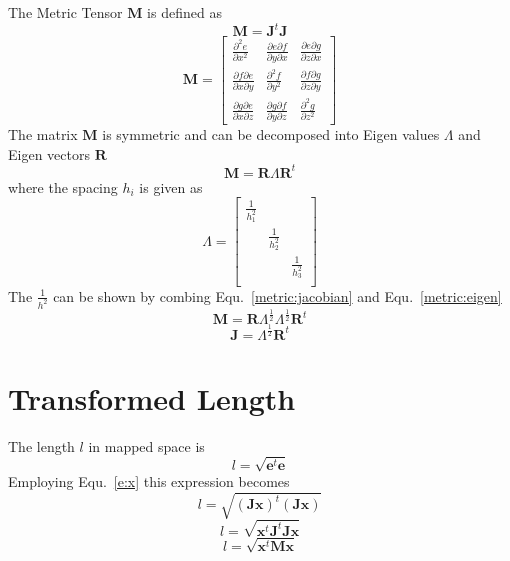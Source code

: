 \documentclass{article}
\begin{document}
The Metric Tensor $\mathbf{M}$ is defined as 
\begin{equation}\label{metric:jacobian}
 \mathbf{M}=\mathbf{J}^t\mathbf{J}
\end{equation}
\begin{equation}
 \mathbf{M}=\left[
 \begin{array}{ccc}
   \frac{\partial^2 e}{\partial x^2}&
   \frac{\partial e \partial f}{\partial y \partial x}&
   \frac{\partial e \partial g}{\partial z \partial x}\\
   \frac{\partial f \partial e}{\partial x \partial y}&
   \frac{\partial^2 f}{\partial y^2}&
   \frac{\partial f \partial g}{\partial z\partial y}\\
   \frac{\partial g \partial e}{\partial x\partial z}&
   \frac{\partial g \partial f}{\partial y\partial z}&
   \frac{\partial^2 g}{\partial z^2}
 \end{array}\right]
\end{equation}
The matrix $\mathbf{M}$ is symmetric and can be decomposed into Eigen
values $\Lambda$ and Eigen vectors $\mathbf{R}$
\begin{equation}\label{metric:eigen}
 \mathbf{M}=\mathbf{R}\Lambda\mathbf{R}^t
\end{equation}
where the spacing $h_i$ is given as 
\begin{equation}
 \Lambda=\left[
 \begin{array}{ccc}
   \frac{1}{h_1^2}&&\\
   &\frac{1}{h_2^2}&\\
   &&\frac{1}{h_3^2}\\
 \end{array}\right]
\end{equation}
The $\frac{1}{h^2}$ can be shown by combing Equ.~\ref{metric:jacobian}
and Equ.~\ref{metric:eigen}
\begin{equation}
 \mathbf{M}=\mathbf{R}\Lambda^\frac{1}{2}\Lambda^\frac{1}{2}\mathbf{R}^t
\end{equation}
\begin{equation}
 \mathbf{J}=\Lambda^\frac{1}{2}\mathbf{R}^t
\end{equation}

\section{Transformed Length}

The length $l$ in mapped space is
\begin{equation}
 l=\sqrt{\mathbf{e}^t\mathbf{e}}
\end{equation}
Employing Equ.~\ref{e:x} this expression becomes
\begin{equation}
 l=\sqrt{ \left( \mathbf{J}\mathbf{x}\right)^t \left( \mathbf{J}\mathbf{x} \right) }
\end{equation}
\begin{equation}
 l=\sqrt{ \mathbf{x}^t\mathbf{J}^t\mathbf{J}\mathbf{x}}
\end{equation}
\begin{equation}
 l=\sqrt{ \mathbf{x}^t\mathbf{M}\mathbf{x}}
\end{equation}
\end{document}

